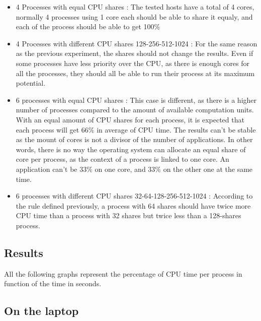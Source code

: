 \begin{itemize}
\item{4 Processes with equal CPU shares : \newline The tested hosts
	have a total of 4 cores, normally 4 processes using 1 core each should
	be able to share it equaly, and each of the process should be able to
	get 100\%
}
\item{4 Processes with different CPU shares 128-256-512-1024 : \newline
	For the same reason as the previous experiment, the
	shares should not change the results. Even if some processes have less
	priority over the CPU, as there is enough cores for all the processes,
	they should all be able to run their process at its maximum potential.
}
\item{6 processes with equal CPU shares : \newline This case is
	different, as there is a higher number of processes compared to the
	amount of available computation units. With an equal amount of CPU
	shares for each process, it is expected that each process will get 66\%
	in average of CPU time.  The results can't be stable as the mount of
	cores is not a divisor of the number of applications. In other words,
	there is no way the operating system can allocate an equal share of
	core per process, as the context of a process is linked to one core. An
	application can't be 33\% on one core, and 33\% on the other one at the
	same time.
}
\item{6 processes with different CPU shares 32-64-128-256-512-1024 : \newline
	According to the rule defined previously, a process with 64 shares
	should have twice more CPU time than a process with 32 shares but twice
	less than a 128-shares process.
}
\end{itemize}

\subsection{Results}

All the following graphs represent the percentage of CPU time per process
in function of the time in seconds.

\subsection{On the laptop}

